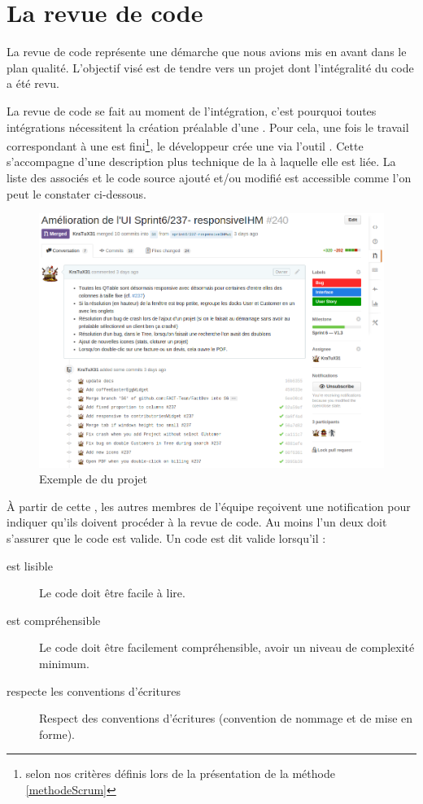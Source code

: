 \section{La revue de code}
La revue de code représente une démarche que nous avions mis en avant dans le plan qualité. L'objectif visé est de tendre vers un projet dont l'intégralité du code a été revu. 

La revue de code se fait au moment de l'intégration, c'est pourquoi toutes intégrations nécessitent la création préalable d'une \PullRequest. Pour cela, une fois le travail correspondant à une \UserStory{} est fini\footnote{selon nos critères définis lors de la présentation de la méthode \Scrum{} \ref{methodeScrum}}, le développeur crée une \PullRequest{} via l'outil \Github. Cette \PullRequest s'accompagne d'une description plus technique de la \UserStory{} à laquelle elle est liée. La liste des \Commits{} associés et le code source ajouté et/ou modifié est accessible comme l'on peut le constater ci-dessous. 
\begin{figure}[H]
	\centering
	\includegraphics[width=0.7\linewidth]{screens/creation_pr_github}
	\caption{Exemple de \PullRequest{} du projet \FactDev}
	\label{fig:creation_pr_github}
\end{figure}

\`A partir de cette \PullRequest, les autres membres de l'équipe reçoivent une notification pour indiquer qu'ils doivent procéder à la revue de code. Au moins l'un deux doit s'assurer que le code est valide. Un code est dit valide lorsqu'il :
\begin{description}
	\item[est lisible] Le code doit être facile à lire. 
	\item[est compréhensible] Le code doit être facilement compréhensible, avoir un niveau de complexité minimum.
	\item[respecte les conventions d'écritures] Respect des conventions d'écritures (convention de nommage et de mise en forme).
\end{description}

